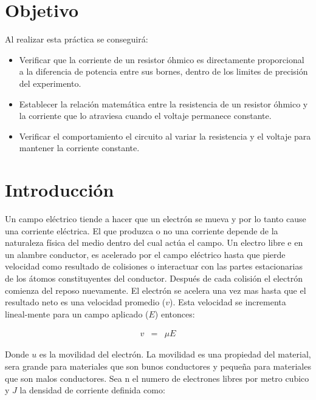 \documentclass[11pt]{article}
\begin{document}
\begin{multicols}{2}

\section{Objetivo}
	Al realizar esta práctica se conseguirá:
	\begin{itemize}
	
		\item Verificar que la corriente de un resistor óhmico es directamente proporcional a la diferencia de potencia entre sus bornes, dentro de los limites de precisión del experimento.
		\item Establecer la relación matemática entre la resistencia de un resistor óhmico y la corriente que lo atraviesa cuando el voltaje permanece constante.
		\item Verificar el comportamiento el circuito al variar la resistencia y el voltaje para mantener la corriente constante.
		

	\end{itemize}


\section{Introducción}
	
		Un campo eléctrico tiende a hacer que un electrón se mueva y por lo tanto cause una corriente eléctrica. El que produzca o no una corriente depende de la naturaleza física del medio dentro del cual actúa el campo.
		Un electro libre e en un alambre conductor, es acelerado por el campo eléctrico hasta que pierde velocidad como resultado de colisiones o interactuar con las partes estacionarias de los átomos constituyentes del conductor. 
		Después de cada colisión el electrón comienza  del reposo nuevamente.
		El electrón se acelera una vez mas hasta que el resultado neto es una velocidad promedio ($v$). Esta velocidad se incrementa lineal-mente para un campo aplicado ($E$) entonces:

		\begin{eqnarray}
			v &=& \mu E \label{eq:1}
		\end{eqnarray}
		
		Donde $u$ es la movilidad del electrón. La movilidad es una propiedad del material, sera grande para materiales que son bunos conductores y pequeña para materiales que son malos conductores.
		Sea n el numero de electrones libres por metro cubico y $J$ la densidad de corriente definida como:


\end{multicols}
\end{document}
